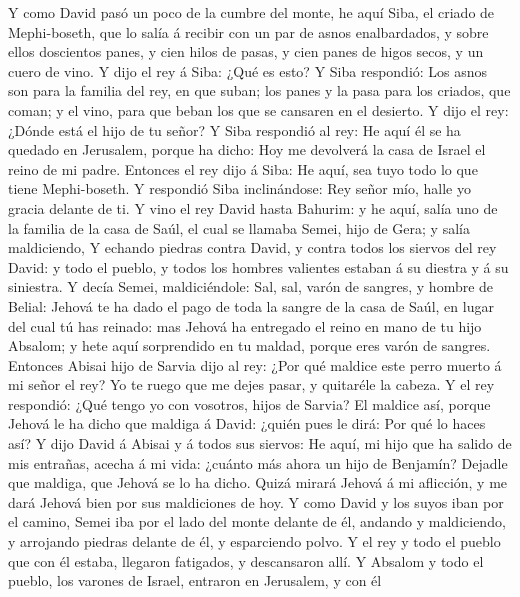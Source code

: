  Y como David pasó un poco de la cumbre del monte, he aquí
Siba, el criado de Mephi-boseth, que lo salía á recibir con un par de
asnos enalbardados, y sobre ellos doscientos panes, y cien hilos de
pasas, y cien panes de higos secos, y un cuero de vino.  Y
dijo el rey á Siba: ¿Qué es esto? Y Siba respondió: Los asnos son para
la familia del rey, en que suban; los panes y la pasa para los criados,
que coman; y el vino, para que beban los que se cansaren en el desierto.
 Y dijo el rey: ¿Dónde está el hijo de tu señor? Y Siba
respondió al rey: He aquí él se ha quedado en Jerusalem, porque ha
dicho: Hoy me devolverá la casa de Israel el reino de mi padre.
 Entonces el rey dijo á Siba: He aquí, sea tuyo todo lo
que tiene Mephi-boseth. Y respondió Siba inclinándose: Rey señor mío,
halle yo gracia delante de ti.  Y vino el rey David hasta
Bahurim: y he aquí, salía uno de la familia de la casa de Saúl, el cual
se llamaba Semei, hijo de Gera; y salía maldiciendo,  Y
echando piedras contra David, y contra todos los siervos del rey David:
y todo el pueblo, y todos los hombres valientes estaban á su diestra y á
su siniestra.  Y decía Semei, maldiciéndole: Sal, sal,
varón de sangres, y hombre de Belial:  Jehová te ha dado
el pago de toda la sangre de la casa de Saúl, en lugar del cual tú has
reinado: mas Jehová ha entregado el reino en mano de tu hijo Absalom; y
hete aquí sorprendido en tu maldad, porque eres varón de sangres.
 Entonces Abisai hijo de Sarvia dijo al rey: ¿Por qué
maldice este perro muerto á mi señor el rey? Yo te ruego que me dejes
pasar, y quitaréle la cabeza.  Y el rey respondió: ¿Qué
tengo yo con vosotros, hijos de Sarvia? El maldice así, porque Jehová le
ha dicho que maldiga á David: ¿quién pues le dirá: Por qué lo haces así?
 Y dijo David á Abisai y á todos sus siervos: He aquí, mi
hijo que ha salido de mis entrañas, acecha á mi vida: ¿cuánto más ahora
un hijo de Benjamín? Dejadle que maldiga, que Jehová se lo ha dicho.
 Quizá mirará Jehová á mi aflicción, y me dará Jehová
bien por sus maldiciones de hoy.  Y como David y los
suyos iban por el camino, Semei iba por el lado del monte delante de él,
andando y maldiciendo, y arrojando piedras delante de él, y esparciendo
polvo.  Y el rey y todo el pueblo que con él estaba,
llegaron fatigados, y descansaron allí.  Y Absalom y todo
el pueblo, los varones de Israel, entraron en Jerusalem, y con él
